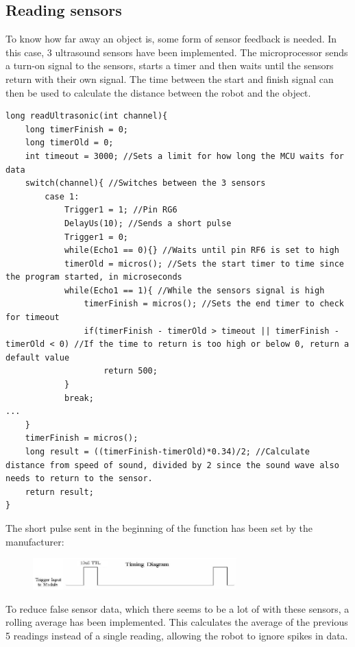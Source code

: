 \subsection{Reading sensors}
To know how far away an object is, some form of sensor feedback is needed. In this case, 3 ultrasound sensors have been implemented. The microprocessor sends a turn-on signal to the sensors, starts a timer and then waits until the sensors return with their own signal. The time between the start and finish signal can then be used to calculate the distance between the robot and the object.\\
\begin{lstlisting}
long readUltrasonic(int channel){  
    long timerFinish = 0;
    long timerOld = 0;
    int timeout = 3000; //Sets a limit for how long the MCU waits for data
    switch(channel){ //Switches between the 3 sensors
        case 1:
            Trigger1 = 1; //Pin RG6
            DelayUs(10); //Sends a short pulse
            Trigger1 = 0;
            while(Echo1 == 0){} //Waits until pin RF6 is set to high
            timerOld = micros(); //Sets the start timer to time since the program started, in microseconds
            while(Echo1 == 1){ //While the sensors signal is high
                timerFinish = micros(); //Sets the end timer to check for timeout
                if(timerFinish - timerOld > timeout || timerFinish - timerOld < 0) //If the time to return is too high or below 0, return a default value
                    return 500;
            }
            break;
...
    }
    timerFinish = micros();
    long result = ((timerFinish-timerOld)*0.34)/2; //Calculate distance from speed of sound, divided by 2 since the sound wave also needs to return to the sensor.
    return result;  
}
\end{lstlisting}
The short pulse sent in the beginning of the function has been set by the manufacturer: \cite{HCSR04Datasheet}
\begin{figure}[!ht]
	\centering
	\includegraphics[width=0.7\textwidth]{figures/sensorTiming.PNG}
	\caption{}
	\label{Timing diagram}
\end{figure}

To reduce false sensor data, which there seems to be a lot of with these sensors, a rolling average has been implemented. This calculates the average of the previous 5 readings instead of a single reading, allowing the robot to ignore spikes in data.
\newpage

